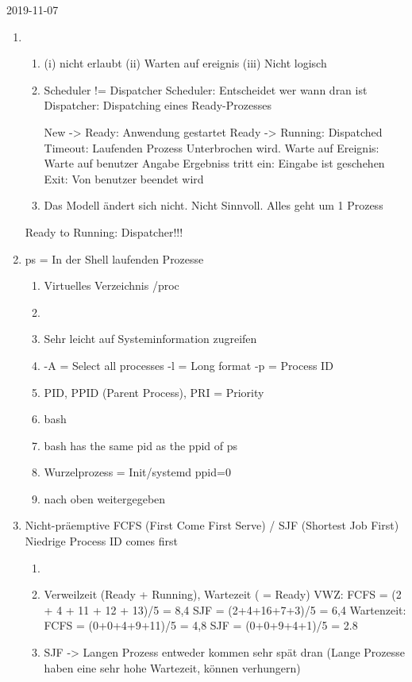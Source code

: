 2019-11-07

\begin{enumerate}[label={T\arabic*},start=12]
	\item 
		\begin{enumerate}
			\item
				(i) nicht erlaubt
				(ii) Warten auf ereignis
				(iii) Nicht logisch
			\item 
				Scheduler != Dispatcher
					Scheduler:  Entscheidet wer wann dran ist
					Dispatcher:	Dispatching eines Ready-Prozesses

				New -> Ready: 			Anwendung gestartet
				Ready -> Running: 		Dispatched
				Timeout:				Laufenden Prozess Unterbrochen wird.
				Warte auf Ereignis: 	Warte auf benutzer Angabe
				Ergebniss tritt ein:	Eingabe ist geschehen
				Exit:					Von benutzer beendet wird
			\item Das Modell ändert sich nicht. Nicht Sinnvoll. Alles geht um 1 Prozess
		\end{enumerate}
	Ready to Running: Dispatcher!!!

	\item ps = In der Shell laufenden Prozesse
		\begin{enumerate}
			\item Virtuelles Verzeichnis /proc
			\item 
			\item Sehr leicht auf Systeminformation zugreifen
			\item 
				-A = Select all processes
				-l = Long format
				-p = Process ID
			\item PID, PPID (Parent Process), PRI = Priority
			\item bash
			\item bash has the same pid as the ppid of ps
			\item Wurzelprozess = Init/systemd ppid=0
			\item nach oben weitergegeben
		\end{enumerate}
	\item Nicht-präemptive FCFS (First Come First Serve) / SJF (Shortest Job First)
		Niedrige Process ID comes first
		\begin{enumerate}
			\item
			\item Verweilzeit (Ready + Running), Wartezeit ( = Ready)
			VWZ:
				FCFS = (2 + 4 + 11 + 12 + 13)/5 = 8,4
				SJF = (2+4+16+7+3)/5 = 6,4
			Wartenzeit:
				FCFS = (0+0+4+9+11)/5 = 4,8
				SJF = (0+0+9+4+1)/5 = 2.8
			\item SJF -> Langen Prozess entweder kommen sehr spät dran (Lange Prozesse haben eine sehr hohe Wartezeit, können verhungern)
		\end{enumerate}
\end{enumerate}